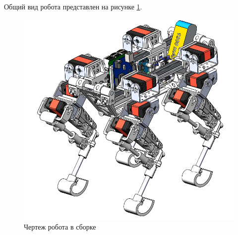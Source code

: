 Общий вид робота представлен на рисунке \ref{fig:final_drawing}.
\begin{figure}[h]
    \centering
    \includegraphics[width=\textwidth]{chapter_mechanics_construction/figure23.png}
    \caption{Чертеж робота в сборке}
    \label{fig:final_drawing}
\end{figure}

